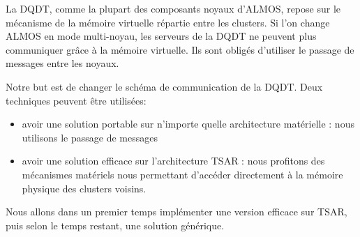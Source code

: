    La DQDT, comme la plupart des composants noyaux d'ALMOS, repose sur le
    mécanisme de la mémoire virtuelle répartie entre les clusters. Si l'on
    change ALMOS en mode multi-noyau, les serveurs de la DQDT ne peuvent plus
    communiquer grâce à la mémoire virtuelle. Ils sont obligés d'utiliser le
    passage de messages entre les noyaux.

    Notre but est de changer le schéma de communication de la DQDT. Deux
    techniques peuvent être utilisées:
    \begin{itemize}
      \item avoir une solution portable sur n'importe quelle architecture
        matérielle : nous utilisons le passage de messages
      \item avoir une solution efficace sur l'architecture TSAR : nous profitons
        des mécanismes matériels nous permettant d'accéder directement à la
        mémoire physique des clusters voisins.
    \end{itemize}

    Nous allons dans un premier temps implémenter une version efficace sur TSAR,
    puis selon le temps restant, une solution générique.

